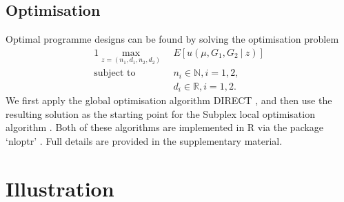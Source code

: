 \documentclass[sagev, Crown]{sagej}
\begin{document}
\subsection{Optimisation}\label{sec:optimisation}

Optimal programme designs can be found by solving the optimisation problem
\begin{alignat}{1}\label{eqn:opt}
\max_{z = (n_1, d_1, n_2, d_2)} ~ & E[u(\mu, G_1, G_2 ~|~ z)] \\
\text{subject to} ~ & n_i \in \mathbb{N}, i=1,2, \nonumber \\ 
& d_i \in \mathbb{R}, i=1,2. \nonumber
\end{alignat}
We first apply the global optimisation algorithm DIRECT \cite{Jones1993}, and then use the resulting solution as the starting point for the Subplex local optimisation algorithm \cite{Rowan1990}. Both of these algorithms are implemented in R via the package `nloptr' \cite{Ypma2018}. Full details are provided in the supplementary material.


\section{Illustration}\label{sec:illustration}

\end{document}
